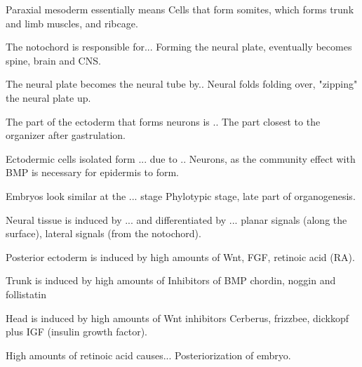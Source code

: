 

\begin{flashcard}[Neurulation]{Paraxial mesoderm essentially means}
    Cells that form somites, which forms trunk and limb muscles, and ribcage. 
\end{flashcard}

\begin{flashcard}[Neurulation]{The notochord is responsible for...}
    Forming the neural plate, eventually becomes spine, brain and CNS.
\end{flashcard}

\begin{flashcard}[Neurulation]{The neural plate becomes the neural tube by..}
    Neural folds folding over, "zipping" the neural plate up. 
\end{flashcard}


\begin{flashcard}[Neurulation]{The part of the ectoderm that forms neurons is ..}
    The part closest to the organizer after gastrulation.
\end{flashcard}

\begin{flashcard}[Neurulation]{Ectodermic cells isolated form ... due to ..}
    Neurons, as the community effect with BMP is necessary for epidermis to form.
\end{flashcard}

\begin{flashcard}[General]{Embryos look similar at the ... stage}
    Phylotypic stage, late part of organogenesis.
\end{flashcard}

\begin{flashcard}{Neural tissue is induced by ... and differentiated by ...}
    planar signals (along the surface), lateral signals (from the notochord).
\end{flashcard}

\begin{flashcard}{Posterior ectoderm is induced by high amounts of }
    Wnt, FGF, retinoic acid (RA).
\end{flashcard}

\begin{flashcard}{Trunk is induced by high amounts of }
    Inhibitors of BMP chordin, noggin and follistatin
\end{flashcard}

\begin{flashcard}{Head is induced by high amounts of }
    Wnt inhibitors Cerberus, frizzbee, dickkopf plus IGF (insulin growth factor).
\end{flashcard}

\begin{flashcard}{High amounts of retinoic acid causes...}
    Posteriorization of embryo.
\end{flashcard}
